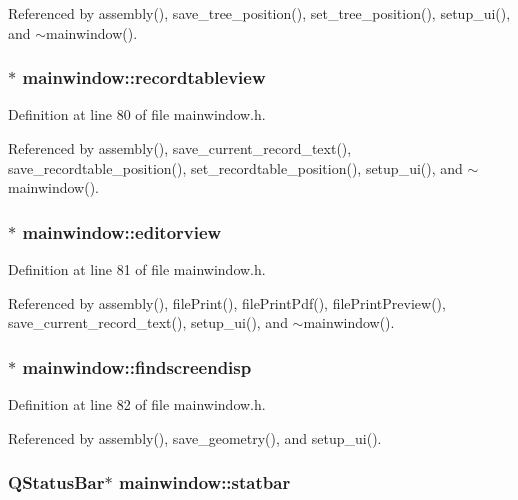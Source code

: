 Referenced by assembly(), save\_\-tree\_\-position(), set\_\-tree\_\-position(), setup\_\-ui(), and $\sim$mainwindow().
\subsubsection{$\ast$ {\bf mainwindow::recordtableview}}\label{classmainwindow_e52eec38c847f7b2bac07ef4bd2a589b}




Definition at line 80 of file mainwindow.h.

Referenced by assembly(), save\_\-current\_\-record\_\-text(), save\_\-recordtable\_\-position(), set\_\-recordtable\_\-position(), setup\_\-ui(), and $\sim$mainwindow().
\subsubsection{$\ast$ {\bf mainwindow::editorview}}\label{classmainwindow_96cc8a1a6f9aee956a2fc66edc6977e1}




Definition at line 81 of file mainwindow.h.

Referenced by assembly(), file\-Print(), file\-Print\-Pdf(), file\-Print\-Preview(), save\_\-current\_\-record\_\-text(), setup\_\-ui(), and $\sim$mainwindow().
\subsubsection{$\ast$ {\bf mainwindow::findscreendisp}}\label{classmainwindow_d5588e5a249f88dba16dec4906017fc0}




Definition at line 82 of file mainwindow.h.

Referenced by assembly(), save\_\-geometry(), and setup\_\-ui().
\subsubsection{\setlength{\rightskip}{0pt plus 5cm}QStatus\-Bar$\ast$ {\bf mainwindow::statbar}}\label{classmainwindow_c60f859bf7c9f4eafc2e2da3e88f1fb4}




